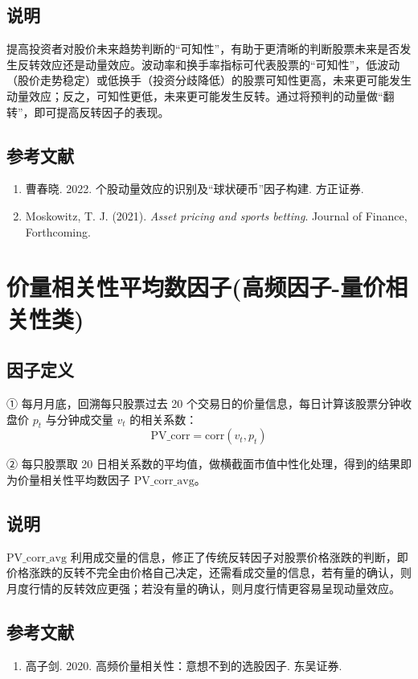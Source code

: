\documentclass{article}
\begin{document}
\subsection{说明}
提高投资者对股价未来趋势判断的“可知性”，有助于更清晰的判断股票未来是否发生反转效应还是动量效应。波动率和换手率指标可代表股票的“可知性”，低波动（股价走势稳定）或低换手（投资分歧降低）的股票可知性更高，未来更可能发生动量效应；反之，可知性更低，未来更可能发生反转。通过将预判的动量做“翻转”，即可提高反转因子的表现。

\subsection{参考文献}
\begin{enumerate}
    \item 曹春晓. 2022. 个股动量效应的识别及“球状硬币”因子构建. 方正证券.
    \item Moskowitz, T. J. (2021). \textit{Asset pricing and sports betting}. Journal of Finance, Forthcoming.
\end{enumerate}

\section{价量相关性平均数因子(高频因子-量价相关性类)}

\subsection{因子定义}

① 每月月底，回溯每只股票过去 20 个交易日的价量信息，每日计算该股票分钟收盘价 \( p_t \) 与分钟成交量 \( v_t \) 的相关系数：
\begin{equation}
    \mathrm{PV\_corr} = \mathrm{corr}(v_t, p_t)
\end{equation}

② 每只股票取 20 日相关系数的平均值，做横截面市值中性化处理，得到的结果即为价量相关性平均数因子 \( \mathrm{PV\_corr\_avg} \)。

\subsection{说明}
\( \mathrm{PV\_corr\_avg} \) 利用成交量的信息，修正了传统反转因子对股票价格涨跌的判断，即价格涨跌的反转不完全由价格自己决定，还需看成交量的信息，若有量的确认，则月度行情的反转效应更强；若没有量的确认，则月度行情更容易呈现动量效应。

\subsection{参考文献}
\begin{enumerate}
    \item 高子剑. 2020. 高频价量相关性：意想不到的选股因子. 东吴证券.
\end{enumerate}
\end{document}
